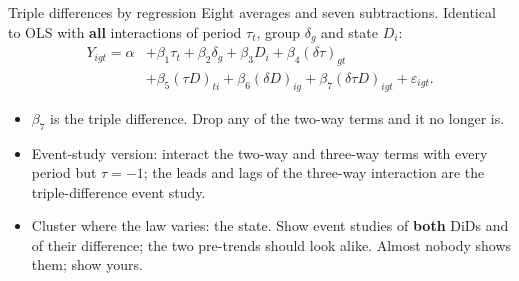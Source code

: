 \documentclass[
  11pt,
  ignorenonframetext,
  aspectratio=169,
]{beamer}
\providecommand{\tightlist}{%
  \setlength{\itemsep}{0pt}\setlength{\parskip}{0pt}}
\begin{document}
\begin{frame}{Triple differences by regression}
\protect{}\label{triple-differences-by-regression}
Eight averages and seven subtractions. Identical to OLS with
\textbf{all} interactions of period \(\tau_t\), group \(\delta_g\) and
state \(D_i\): \[
\begin{aligned}
Y_{igt} = \alpha &+ \beta_1\tau_t + \beta_2 \delta_g + \beta_3 D_i + \beta_4(\delta\tau)_{gt} \\
&+ \beta_5(\tau D)_{ti} + \beta_6(\delta D)_{ig} + \beta_7(\delta \tau D)_{igt} + \varepsilon_{igt}.
\end{aligned}
\]

\begin{itemize}
\tightlist
\item
  \(\beta_7\) is the triple difference. Drop any of the two-way terms
  and it no longer is.
\item
  Event-study version: interact the two-way and three-way terms with
  every period but \(\tau = -1\); the leads and lags of the three-way
  interaction are the triple-difference event study.
\item
  Cluster where the law varies: the state. Show event studies of
  \textbf{both} DiDs and of their difference; the two pre-trends should
  look alike. Almost nobody shows them; show yours.
\end{itemize}
\end{frame}
\end{document}
